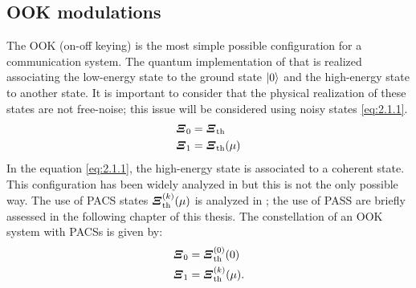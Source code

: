     \subsection{OOK modulations}
        The OOK (on-off keying) is the most simple possible configuration for a communication system.
        The quantum implementation of that is realized associating the low-energy state to the 
        ground state $\ket{0}$ and the high-energy state to another state. It is important to
        consider that the physical realization of these states are not free-noise; this issue will be
        considered using noisy states \ref{eq:2.1.1}.
        \begin{equation}\begin{split}
            \Operator{\varXi}_0 &= \Operator{\varXi}_{\mathrm{th}}\\
            \Operator{\varXi}_1 &= \Operator{\varXi}_{\mathrm{th}}(\mu)
            \label{eq:2.1.1}
        \end{split}\end{equation}
        In the equation \ref{eq:2.1.1}, the high-energy state is associated to a coherent state. This 
        configuration has been widely analyzed in \cite{helstrom1,helstrom2,coherentComm1,coherentComm2,
        coherentComm3,coherentComm4} but this is not the only possible way. The use of PACS states 
        $\Operator{\varXi}_{\mathrm{th}}^{(k)}(\mu)$ is analyzed in \cite{PACSDisc,tesiGuerrini}; the use of PASS are briefly
        assessed in the following chapter of this thesis.
        The constellation of an OOK system with PACSs is given by:
        \begin{equation}\begin{split}
            \Operator{\varXi}_0 &= \Operator{\varXi}_{\mathrm{th}}^{(0)}(0)\\
            \Operator{\varXi}_1 &= \Operator{\varXi}_{\mathrm{th}}^{(k)}(\mu).
            \label{eq:2.1.15}
        \end{split}\end{equation}

